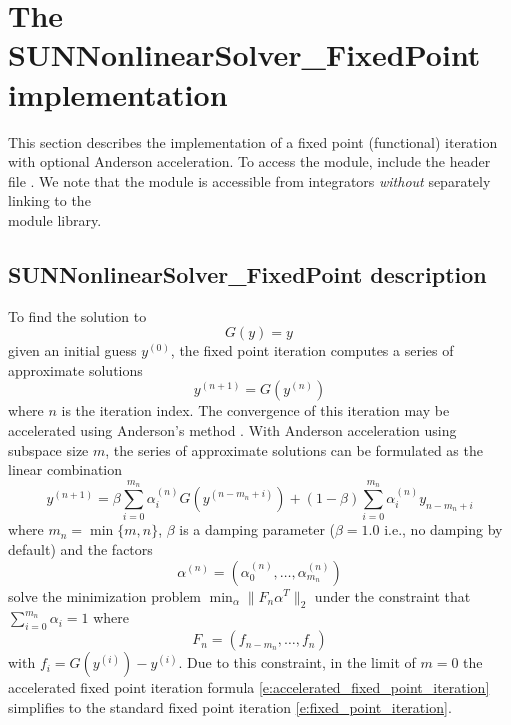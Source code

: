 \section{The SUNNonlinearSolver\_FixedPoint implementation}
\label{s:sunnonlinsol_fixedpoint}

This section describes the {\sunnonlinsol} implementation of a fixed point
(functional) iteration with optional Anderson acceleration. To access the
{\sunnonlinsolfixedpoint} module, include the header file
. We note that the
{\sunnonlinsolfixedpoint} module is accessible from {\sundials} integrators
\textit{without} separately linking to the\\
\noindent{} module library.

\subsection{SUNNonlinearSolver\_FixedPoint description}
\label{ss:sunnonlinsolfixedpoint_math}

To find the solution to
\begin{equation}\label{e:fixed_point_sys}
  G(y) = y \,
\end{equation}
given an initial guess $y^{(0)}$, the fixed point iteration computes a series of
approximate solutions
\begin{equation}\label{e:fixed_point_iteration}
  y^{(n+1)} = G(y^{(n)})
\end{equation}
where $n$ is the iteration index. The convergence of this iteration may be
accelerated using Anderson's method \cite{Anderson65, Walker-Ni09, Fang-Saad09,
LWWY11}. With Anderson acceleration using subspace size $m$, the series of
approximate solutions can be formulated as the linear combination
\begin{equation}\label{e:accelerated_fixed_point_iteration}
  y^{(n+1)} = \beta \sum_{i=0}^{m_n} \alpha_i^{(n)} G(y^{(n-m_n+i)}) +
  (1 - \beta) \sum_{i=0}^{m_n} \alpha_i^{(n)} y_{n-m_n+i}
\end{equation}
where $m_n = \min\{m,n\}$, $\beta$ is a damping parameter ($\beta = 1.0$
i.e., no damping by default) and the factors
\begin{equation}
\alpha^{(n)} =(\alpha_0^{(n)}, \ldots, \alpha_{m_n}^{(n)})
\end{equation}
solve the minimization problem $\min_\alpha  \| F_n \alpha^T \|_2$ under the
constraint that $\sum_{i=0}^{m_n} \alpha_i = 1$ where
\begin{equation}
F_{n} = (f_{n-m_n}, \ldots, f_{n})
\end{equation}
with $f_i = G(y^{(i)}) - y^{(i)}$. Due to this constraint, in the limit of $m=0$
the accelerated fixed point iteration formula
\eqref{e:accelerated_fixed_point_iteration} simplifies to the standard
fixed point iteration \eqref{e:fixed_point_iteration}.

